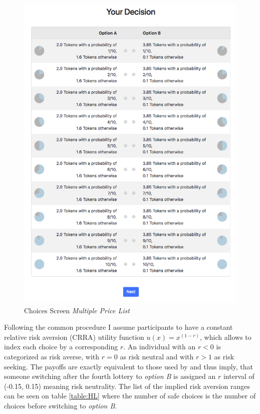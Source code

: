      \begin{figure}
         \centering
         \includegraphics[width=\textwidth]{graphs/Choices_MPL.png}
         \caption{Choices Screen \textit{Multiple Price List}}
         \label{fig:choices_mpl}
     \end{figure}
     
     
    Following the common procedure I assume participants to have a constant relative risk aversion (CRRA) utility function $u(x)=x^{(1-r)}$, which allows to index each choice by a corresponding $r$. An individual with an $r<0$ is categorized as risk averse, with $r=0$ as risk neutral and with $r>1$ as risk seeking. The payoffs are exactly equivalent to those used by \cite{holt2002} and thus imply, that someone switching after the fourth lottery to \textit{option B} is assigned an $r$ interval of (-0.15, 0.15) meaning risk neutrality. The list of the implied risk aversion ranges can be seen on table \ref{table:HL} where the number of safe choices is the number of choices before switching to \textit{option B}.
    
